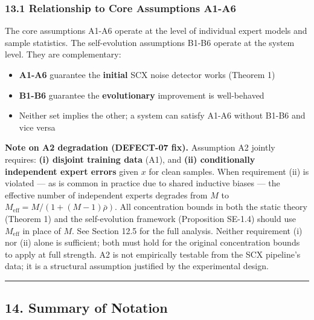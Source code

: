 \documentclass[
  12pt,
]{article}
\providecommand{\tightlist}{%
  \setlength{\itemsep}{0pt}\setlength{\parskip}{0pt}}
\begin{document}
\subsubsection{13.1 Relationship to Core Assumptions
A1-A6}\label{relationship-to-core-assumptions-a1-a6}

The core assumptions A1-A6 operate at the level of individual expert
models and sample statistics. The self-evolution assumptions B1-B6
operate at the system level. They are complementary:

\begin{itemize}
\tightlist
\item
  \textbf{A1-A6} guarantee the \textbf{initial} SCX noise detector works
  (Theorem 1)
\item
  \textbf{B1-B6} guarantee the \textbf{evolutionary} improvement is
  well-behaved
\item
  Neither set implies the other; a system can satisfy A1-A6 without
  B1-B6 and vice versa
\end{itemize}

\textbf{Note on A2 degradation (DEFECT-07 fix).} Assumption A2 jointly
requires: \textbf{(i) disjoint training data} (A1), and \textbf{(ii)
conditionally independent expert errors} given \(x\) for clean samples.
When requirement (ii) is violated --- as is common in practice due to
shared inductive biases --- the effective number of independent experts
degrades from \(M\) to \(M_{\text{eff}} = M/(1+(M-1)\bar{\rho})\). All
concentration bounds in both the static theory (Theorem 1) and the
self-evolution framework (Proposition SE-1.4) should use
\(M_{\text{eff}}\) in place of \(M\). See Section 12.5 for the full
analysis. Neither requirement (i) nor (ii) alone is sufficient; both
must hold for the original concentration bounds to apply at full
strength. A2 is not empirically testable from the SCX pipeline's data;
it is a structural assumption justified by the experimental design.

\begin{center}\rule{0.5\linewidth}{0.5pt}\end{center}

\subsection{14. Summary of Notation}\label{summary-of-notation}
\end{document}

